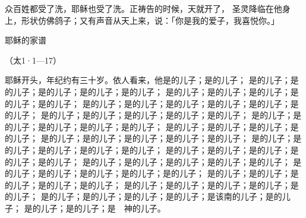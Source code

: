 {\par }{\PP {}众百姓都受了洗，耶稣也受了洗。正祷告的时候，天就开了，
圣灵降临在他身上，形状仿佛鸽子；又有声音从天上来，说：「你是我的爱子，我喜悦你。」
\par }{\SH 耶稣的家谱
\par }{\R （太1·1—17）
\par }{\PP {}耶稣开头{}，年纪约有三十岁。依人看来，他是{}的儿子；{}是{}的儿子；
是{}的儿子；{}是{}的儿子；{}是{}的儿子；{}是{}的儿子；{}是{}的儿子；
是{}的儿子；{}是{}的儿子；{}是{}的儿子；{}是{}的儿子；{}是{}的儿子；
是{}的儿子；{}是{}的儿子；{}是{}的儿子；{}是{}的儿子；{}是{}的儿子；{}是{}的儿子；
是{}的儿子；{}是{}的儿子；{}是{}的儿子；{}是{}的儿子；{}是{}的儿子；
是{}的儿子；{}是{}的儿子；{}是{}的儿子；{}是{}的儿子；{}是{}的儿子；
是{}的儿子；{}是{}的儿子；{}是{}的儿子；{}是{}的儿子；
是{}的儿子；{}是{}的儿子；{}是{}的儿子；{}是{}的儿子；{}是{}的儿子；
是{}的儿子；{}是{}的儿子；{}是{}的儿子；{}是{}的儿子；{}是{}的儿子；
是{}的儿子；{}是{}的儿子；{}是{}的儿子；{}是{}的儿子；{}是{}的儿子；
是{}的儿子；{}是{}的儿子；{}是{}的儿子；{}是{}的儿子；{}是{}的儿子；
是{}的儿子；{}是{}的儿子；{}是{}的儿子；{}是{}的儿子；{}是{}的儿子；
是{}的儿子；{}是{}的儿子；{}是{}的儿子；{}是{}的儿子；{}是{}的儿子；
是{}的儿子；{}是{}的儿子；{}是{}的儿子；{}是{}的儿子；{}是{}的儿子；
是{}的儿子；{}是{}的儿子；{}是{}的儿子；{}是{}的儿子；{}是该南的儿子；{}是{}的儿子；
是{}的儿子；{}是{}的儿子；{}是　神的儿子。

}
